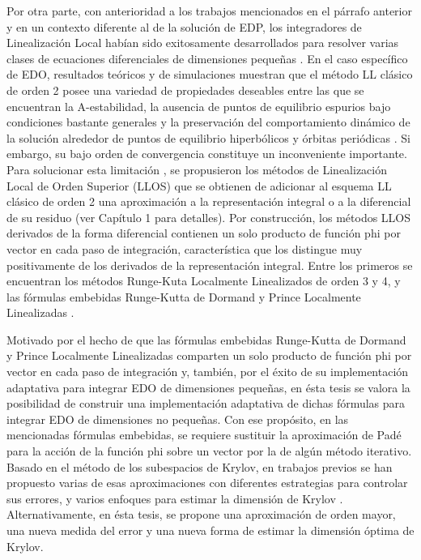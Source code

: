 Por otra parte, con anterioridad a los trabajos mencionados en el párrafo anterior y en un contexto diferente al de la solución de EDP, los integradores de Linealización Local habían sido exitosamente desarrollados para resolver varias clases de ecuaciones diferenciales de dimensiones pequeñas \cite{jimenez2020}.
 En el caso específico de EDO, resultados teóricos y de simulaciones muestran que el método LL clásico de orden 2  \cite{pope1963exponential} posee una variedad de propiedades deseables entre las que se encuentran la A-estabilidad, la ausencia de puntos de equilibrio espurios bajo condiciones bastante generales y la preservación del comportamiento dinámico de la solución alrededor de puntos de equilibrio hiperbólicos y órbitas periódicas \cite{Jimenez02AMC}. Si embargo, su bajo orden de convergencia constituye un inconveniente importante. Para solucionar esta limitación \cite{delaCruz06,delaCruz07,Jimenez13}, se propusieron los métodos de Linealización Local de Orden Superior (LLOS) que se obtienen de adicionar al esquema LL clásico de orden 2 una aproximación a la representación integral o a la diferencial de su residuo (ver Capítulo 1 para detalles). Por construcción, los métodos LLOS derivados de la forma diferencial contienen un solo  producto de función phi por vector en cada paso de integración, característica que los distingue muy positivamente de los derivados de la representación integral. Entre los primeros se encuentran los métodos Runge-Kuta Localmente Linealizados de orden 3 y 4, y las fórmulas embebidas Runge-Kutta de Dormand y Prince Localmente Linealizadas \cite{delaCruz06,Jimenez13,Jimenez14AMC}.

Motivado por el hecho de que las fórmulas embebidas Runge-Kutta de Dormand y Prince Localmente Linealizadas comparten un solo producto de función phi por vector en cada paso de integración y, también, por el éxito de su implementación adaptativa para integrar EDO de dimensiones pequeñas, en ésta tesis se valora la posibilidad de construir una implementación adaptativa de dichas fórmulas para integrar EDO de dimensiones no pequeñas. Con ese propósito, en las mencionadas fórmulas embebidas, se requiere sustituir la aproximación de Padé para la acción de la función phi sobre un vector por la de algún método iterativo. Basado en el método de los subespacios de Krylov, en trabajos previos se han propuesto varias de esas aproximaciones con diferentes estrategias para controlar sus errores, y varios enfoques para estimar la dimensión de Krylov \cite{hochbruck1998exponential,sidje1998expokit,niesen2012algorithm,gaudreault2018kiops}. Alternativamente, en ésta tesis, se propone una aproximación de orden mayor, una nueva medida del error y una nueva forma de estimar la dimensión óptima de Krylov.


